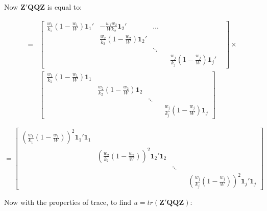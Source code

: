 Now $\mathbf{Z}'\mathbf{Q}\mathbf{Q}\mathbf{Z}$ is equal to: 

\begin{equation}
\begin{split}
   = & \begin{bmatrix}
        \frac{w_1}{k_1}(1 - \frac{w_1}{W})\mathbf{1}_1' & -\frac{w_1w_2}{Wk_2}\mathbf{1}_2' &  \dots  &  &  &   \\
         &  \frac{w_2}{k_2}(1 - \frac{w_2}{W})\mathbf{1}_2' & & &   \\
         & & \ddots & &  \\
         & & & &  \frac{w_j}{k_j}(1 - \frac{w_j}{W})\mathbf{1}_j'
    \end{bmatrix}  \times \\
    & \begin{bmatrix}
        \frac{w_1}{k_1}(1 - \frac{w_1}{W})\mathbf{1}_1 & &   &  &    \\
         &  \frac{w_2}{k_2}(1 - \frac{w_2}{W})\mathbf{1}_2 & & &   \\
         & & \ddots & &  \\
         & & & &  \frac{w_j}{k_j}(1 - \frac{w_j}{W})\mathbf{1}_j
    \end{bmatrix} 
\end{split}
    \nonumber
\end{equation}


\begin{equation}
   = \begin{bmatrix}
        (\frac{w_1}{k_1}(1 - \frac{w_1}{W}))^2\mathbf{1}_1'\mathbf{1}_1 & &   &  &     \\
         &  (\frac{w_2}{k_2}(1 - \frac{w_2}{W}))^2\mathbf{1}_2'\mathbf{1}_2 & & &   \\
         & & \ddots & &  \\
         & & & &  (\frac{w_j}{k_j}(1 - \frac{w_j}{W}))^2\mathbf{1}_j'\mathbf{1}_j
    \end{bmatrix} 
    \nonumber
\end{equation}

Now with the properties of trace, to find $u = tr(\mathbf{Z}'\mathbf{Q}\mathbf{Q}\mathbf{Z})$:

